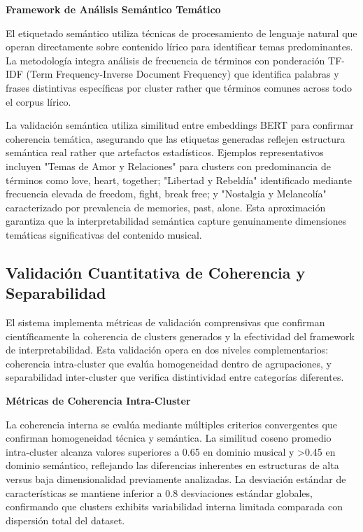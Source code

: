 \documentclass[12pt,a4paper]{report}
\begin{document}
\textbf{Framework de Análisis Semántico Temático}

El etiquetado semántico utiliza técnicas de procesamiento de lenguaje natural que operan directamente sobre contenido lírico para identificar temas predominantes. La metodología integra análisis de frecuencia de términos con ponderación TF-IDF (Term Frequency-Inverse Document Frequency) que identifica palabras y frases distintivas específicas por cluster rather que términos comunes across todo el corpus lírico.

La validación semántica utiliza similitud entre embeddings BERT para confirmar coherencia temática, asegurando que las etiquetas generadas reflejen estructura semántica real rather que artefactos estadísticos. Ejemplos representativos incluyen "Temas de Amor y Relaciones" para clusters con predominancia de términos como love, heart, together; "Libertad y Rebeldía" identificado mediante frecuencia elevada de freedom, fight, break free; y "Nostalgia y Melancolía" caracterizado por prevalencia de memories, past, alone. Esta aproximación garantiza que la interpretabilidad semántica capture genuinamente dimensiones temáticas significativas del contenido musical.

\subsection{Validación Cuantitativa de Coherencia y Separabilidad}

El sistema implementa métricas de validación comprensivas que confirman científicamente la coherencia de clusters generados y la efectividad del framework de interpretabilidad. Esta validación opera en dos niveles complementarios: coherencia intra-cluster que evalúa homogeneidad dentro de agrupaciones, y separabilidad inter-cluster que verifica distintividad entre categorías diferentes.

\textbf{Métricas de Coherencia Intra-Cluster}

La coherencia interna se evalúa mediante múltiples criterios convergentes que confirman homogeneidad técnica y semántica. La similitud coseno promedio intra-cluster alcanza valores superiores a 0.65 en dominio musical y >0.45 en dominio semántico, reflejando las diferencias inherentes en estructuras de alta versus baja dimensionalidad previamente analizadas. La desviación estándar de características se mantiene inferior a 0.8 desviaciones estándar globales, confirmando que clusters exhibits variabilidad interna limitada comparada con dispersión total del dataset.
\end{document}
